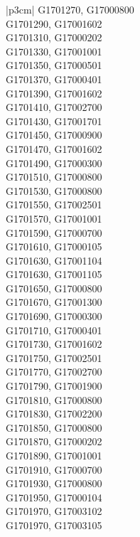 \begin{customLongTable}{ |p{3cm}| }
G1701270, G17000800 \\ \hline
G1701290, G17001602 \\ \hline
G1701310, G17000202 \\ \hline
G1701330, G17001001 \\ \hline
G1701350, G17000501 \\ \hline
G1701370, G17000401 \\ \hline
G1701390, G17001602 \\ \hline
G1701410, G17002700 \\ \hline
G1701430, G17001701 \\ \hline
G1701450, G17000900 \\ \hline
G1701470, G17001602 \\ \hline
G1701490, G17000300 \\ \hline
G1701510, G17000800 \\ \hline
G1701530, G17000800 \\ \hline
G1701550, G17002501 \\ \hline
G1701570, G17001001 \\ \hline
G1701590, G17000700 \\ \hline
G1701610, G17000105 \\ \hline
G1701630, G17001104 \\ \hline
G1701630, G17001105 \\ \hline
G1701650, G17000800 \\ \hline
G1701670, G17001300 \\ \hline
G1701690, G17000300 \\ \hline
G1701710, G17000401 \\ \hline
G1701730, G17001602 \\ \hline
G1701750, G17002501 \\ \hline
G1701770, G17002700 \\ \hline
G1701790, G17001900 \\ \hline
G1701810, G17000800 \\ \hline
G1701830, G17002200 \\ \hline
G1701850, G17000800 \\ \hline
G1701870, G17000202 \\ \hline
G1701890, G17001001 \\ \hline
G1701910, G17000700 \\ \hline
G1701930, G17000800 \\ \hline
G1701950, G17000104 \\ \hline
G1701970, G17003102 \\ \hline
G1701970, G17003105 \\ \hline

\end{customLongTable}
